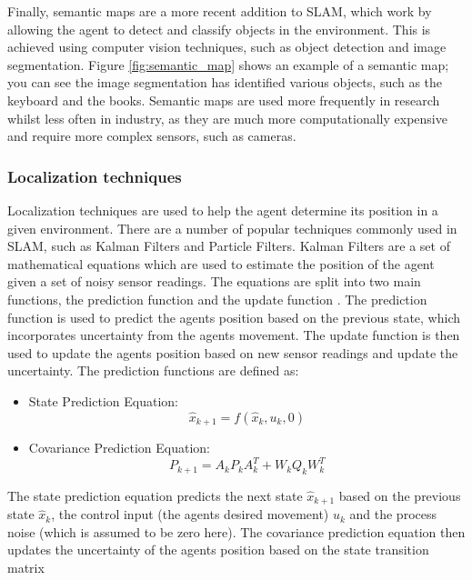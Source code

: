 \documentclass[12pt]{article}
\begin{document}
Finally, semantic maps are a more recent addition to SLAM, which work by allowing the agent to detect and classify objects in the environment.
This is achieved using computer vision techniques, such as object detection and image segmentation. Figure \ref{fig:semantic_map} shows an example
of a semantic map; you can see the image segmentation has identified various objects, such as the keyboard and the books. Semantic maps are used
more frequently in research whilst less often in industry, as they are much more computationally expensive and require more complex sensors, such as
cameras.\\

\subsubsection{Localization techniques}
Localization techniques are used to help the agent determine its position in a given environment. There are a number of
popular techniques commonly used in SLAM, such as Kalman Filters and Particle Filters. Kalman Filters are a set of
mathematical equations which are used to estimate the position of the agent given a set of noisy sensor readings. The
equations are split into two main functions, the prediction function and the update function \cite{intro_to_EKF}. The
prediction function is used to predict the agents position based on the previous state, which incorporates uncertainty
from the agents movement. The update function is then used to update the agents position based on new sensor readings and
update the uncertainty. The prediction functions are defined as:
\begin{itemize}
    \item State Prediction Equation:
    \begin{equation}
        \hat{x}_{k+1} = f(\hat{x}_{k}, u_{k}, 0)
    \end{equation}
    \item Covariance Prediction Equation:
    \begin{equation}
        P_{k+1} = A_{k} P_{k} A_{k}^T + W_{k} Q_{k} W_{k}^T
    \end{equation}
\end{itemize}
The state prediction equation predicts the next state \(\hat{x}_{k+1}\) based on the previous state \(\hat{x}_{k}\), the
control input (the agents desired movement) \(u_{k}\) and the process noise (which is assumed to be zero here). The
covariance prediction equation then updates the uncertainty of the agents position based on the state transition matrix
\end{document}
